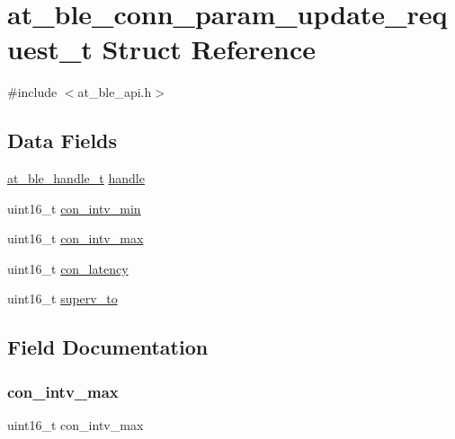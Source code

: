 \hypertarget{structat__ble__conn__param__update__request__t}{}\section{at\+\_\+ble\+\_\+conn\+\_\+param\+\_\+update\+\_\+request\+\_\+t Struct Reference}
\label{structat__ble__conn__param__update__request__t}


{\ttfamily \#include $<$at\+\_\+ble\+\_\+api.\+h$>$}

\subsection*{Data Fields}
\begin{DoxyCompactItemize}
\item 
\mbox{\hyperlink{at__ble__api_8h_abd23646d0c662860741f787efc8456f2}{at\+\_\+ble\+\_\+handle\+\_\+t}} \mbox{\hyperlink{structat__ble__conn__param__update__request__t_ab8b0f353cb6a8d85f0822900e3b7cf35}{handle}}
\item 
uint16\+\_\+t \mbox{\hyperlink{structat__ble__conn__param__update__request__t_a68d4f4fa7525b2b45377b8c4cbdd4c46}{con\+\_\+intv\+\_\+min}}
\item 
uint16\+\_\+t \mbox{\hyperlink{structat__ble__conn__param__update__request__t_ac54a0ba78bb94b5e8ec8924e7ed2e641}{con\+\_\+intv\+\_\+max}}
\item 
uint16\+\_\+t \mbox{\hyperlink{structat__ble__conn__param__update__request__t_a7a288732b0f90cff943de752cbeb8df4}{con\+\_\+latency}}
\item 
uint16\+\_\+t \mbox{\hyperlink{structat__ble__conn__param__update__request__t_a2bfc39c9b1e75f97c055d5978387570d}{superv\+\_\+to}}
\end{DoxyCompactItemize}


\subsection{Field Documentation}
\mbox{\label{structat__ble__conn__param__update__request__t_ac54a0ba78bb94b5e8ec8924e7ed2e641}} 
\subsubsection{\texorpdfstring{con\_intv\_max}{con\_intv\_max}}
{\footnotesize\ttfamily uint16\+\_\+t con\+\_\+intv\+\_\+max}

